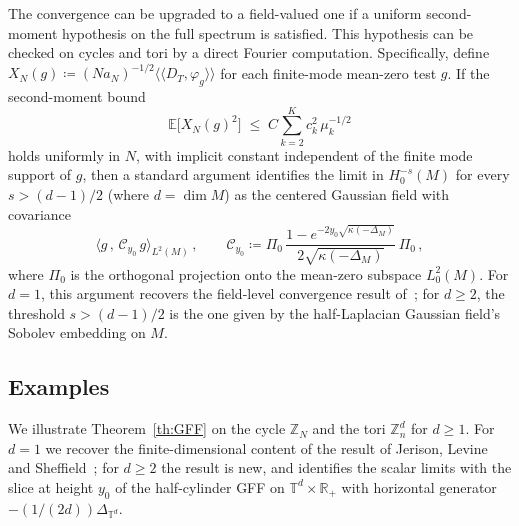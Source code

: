 \documentclass[11pt,a4paper,reqno]{amsart}
\theoremstyle{definition}
\newcommand{\cC}{\ensuremath{\mathcal C}}
\newcommand{\bbE}{{\ensuremath{\mathbb E}} }
\newcommand{\bbR}{{\ensuremath{\mathbb R}} }
\newcommand{\bbT}{{\ensuremath{\mathbb T}} }
\newcommand{\bbZ}{{\ensuremath{\mathbb Z}} }
\newcommand{\laa}{\langle \! \langle}
\newcommand{\raa}{\rangle \! \rangle}
\let\m=\mu   \let\n=\nu   \let\o=\omega    \let\p=\pi  \let\ph=\varphi
\begin{document}
The convergence can be upgraded to a field-valued one if a uniform second-moment hypothesis on the full spectrum is satisfied. This hypothesis can be checked on cycles and tori by a direct Fourier computation. Specifically, define $X_N(g) \coloneqq (Na_N)^{-1/2}\laa D_T, \varphi_g\raa$ for each finite-mode mean-zero test $g$. If the second-moment bound
	\begin{equation}\label{eq:uniform-H}
	\tag{H}
	\bbE\!\big[ X_N(g)^2 \big] \;\leq\; C \sum_{k=2}^K c_k^2\,\m_k^{-1/2}
	\end{equation}
holds uniformly in $N$, with implicit constant independent of the finite mode support of $g$, then a standard argument identifies the limit in $H^{-s}_0(M)$ for every $s > (d-1)/2$ (where $d = \dim M$) as the centered Gaussian field with covariance
	\begin{equation}\label{eq:operatorvar}
	 \big\langle g\,,\, \cC_{y_0}\, g \big\rangle_{L^2(M)}\,, \qquad
	 \cC_{y_0} \coloneqq \Pi_0\,\frac{1 - e^{-2y_0\sqrt{\kappa(-\Delta_M)}}}{2\sqrt{\kappa(-\Delta_M)}}\,\Pi_0\,,
	\end{equation}
where $\Pi_0$ is the orthogonal projection onto the mean-zero subspace $L^2_0(M)$. For $d = 1$, this argument recovers the field-level convergence result of~\cite{jerison2014internal2}; for $d \geq 2$, the threshold $s > (d-1)/2$ is the one given by the half-Laplacian Gaussian field's Sobolev embedding on $M$.
\subsection{Examples}
We illustrate Theorem~\ref{th:GFF} on the cycle $\bbZ_N$ and the tori $\bbZ_n^d$ for $d \geq 1$. For $d = 1$ we recover the finite-dimensional content of the result of Jerison, Levine and Sheffield~\cite{jerison2014internal2}; for $d \geq 2$ the result is new, and identifies the scalar limits with the slice at height $y_0$ of the half-cylinder GFF on $\bbT^d \times \bbR_+$ with horizontal generator $-(1/(2d))\Delta_{\bbT^d}$.
\end{document}
